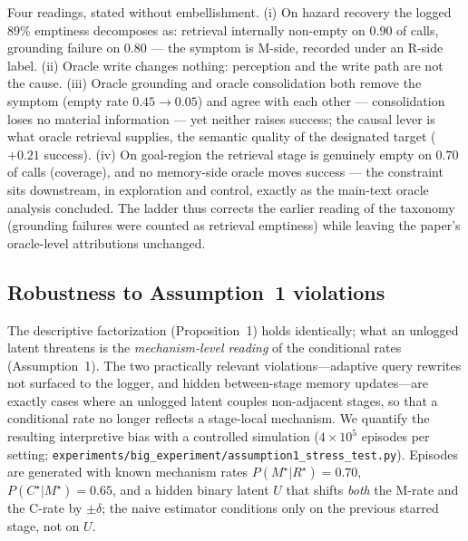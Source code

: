 \documentclass{article}
\newcommand{\method}[1]{\texttt{#1}}
\begin{document}
Four readings, stated without embellishment. (i) On hazard recovery
the logged $89\%$ emptiness decomposes as: retrieval internally
non-empty on $0.90$ of calls, grounding failure on $0.80$ --- the
symptom is M-side, recorded under an R-side label. (ii) Oracle write
changes nothing: perception and the write path are not the cause.
(iii) Oracle grounding and oracle consolidation both remove the
symptom (empty rate $0.45 \to 0.05$) and agree with each other ---
consolidation loses no material information --- yet neither raises
success; the causal lever is what oracle retrieval supplies, the
semantic quality of the designated target ($+0.21$ success). (iv) On
goal-region the retrieval stage is genuinely empty on $0.70$ of calls
(coverage), and no memory-side oracle moves success --- the constraint
sits downstream, in exploration and control, exactly as the main-text
oracle analysis concluded. The ladder thus corrects the earlier
reading of the taxonomy (grounding failures were counted as retrieval
emptiness) while leaving the paper's oracle-level attributions
unchanged.

\subsection{Robustness to Assumption~1 violations}
\label{p1:app:assumption1-stress}

The descriptive factorization (Proposition~1) holds identically; what an unlogged latent threatens is the \emph{mechanism-level reading} of the conditional rates (Assumption~1). The two practically relevant violations---adaptive query rewrites not surfaced to the logger, and hidden between-stage memory updates---are exactly cases where an unlogged latent couples non-adjacent stages, so that a conditional rate no longer reflects a stage-local mechanism. We quantify the resulting interpretive bias with a controlled simulation ($4\!\times\!10^5$ episodes per setting; \method{experiments/big\_experiment/assumption1\_stress\_test.py}). Episodes are generated with known mechanism rates $P(M^\star|R^\star){=}0.70$, $P(C^\star|M^\star){=}0.65$, and a hidden binary latent $U$ that shifts \emph{both} the M-rate and the C-rate by $\pm\delta$; the naive estimator conditions only on the previous starred stage, not on $U$.
\end{document}
